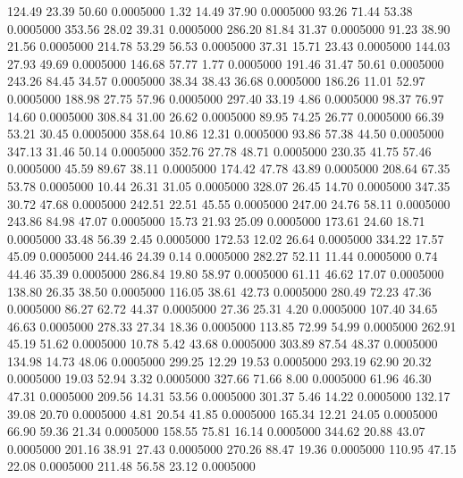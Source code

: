  124.49   23.39   50.60   0.0005000
   1.32   14.49   37.90   0.0005000
  93.26   71.44   53.38   0.0005000
 353.56   28.02   39.31   0.0005000
 286.20   81.84   31.37   0.0005000
  91.23   38.90   21.56   0.0005000
 214.78   53.29   56.53   0.0005000
  37.31   15.71   23.43   0.0005000
 144.03   27.93   49.69   0.0005000
 146.68   57.77    1.77   0.0005000
 191.46   31.47   50.61   0.0005000
 243.26   84.45   34.57   0.0005000
  38.34   38.43   36.68   0.0005000
 186.26   11.01   52.97   0.0005000
 188.98   27.75   57.96   0.0005000
 297.40   33.19    4.86   0.0005000
  98.37   76.97   14.60   0.0005000
 308.84   31.00   26.62   0.0005000
  89.95   74.25   26.77   0.0005000
  66.39   53.21   30.45   0.0005000
 358.64   10.86   12.31   0.0005000
  93.86   57.38   44.50   0.0005000
 347.13   31.46   50.14   0.0005000
 352.76   27.78   48.71   0.0005000
 230.35   41.75   57.46   0.0005000
  45.59   89.67   38.11   0.0005000
 174.42   47.78   43.89   0.0005000
 208.64   67.35   53.78   0.0005000
  10.44   26.31   31.05   0.0005000
 328.07   26.45   14.70   0.0005000
 347.35   30.72   47.68   0.0005000
 242.51   22.51   45.55   0.0005000
 247.00   24.76   58.11   0.0005000
 243.86   84.98   47.07   0.0005000
  15.73   21.93   25.09   0.0005000
 173.61   24.60   18.71   0.0005000
  33.48   56.39    2.45   0.0005000
 172.53   12.02   26.64   0.0005000
 334.22   17.57   45.09   0.0005000
 244.46   24.39    0.14   0.0005000
 282.27   52.11   11.44   0.0005000
   0.74   44.46   35.39   0.0005000
 286.84   19.80   58.97   0.0005000
  61.11   46.62   17.07   0.0005000
 138.80   26.35   38.50   0.0005000
 116.05   38.61   42.73   0.0005000
 280.49   72.23   47.36   0.0005000
  86.27   62.72   44.37   0.0005000
  27.36   25.31    4.20   0.0005000
 107.40   34.65   46.63   0.0005000
 278.33   27.34   18.36   0.0005000
 113.85   72.99   54.99   0.0005000
 262.91   45.19   51.62   0.0005000
  10.78    5.42   43.68   0.0005000
 303.89   87.54   48.37   0.0005000
 134.98   14.73   48.06   0.0005000
 299.25   12.29   19.53   0.0005000
 293.19   62.90   20.32   0.0005000
  19.03   52.94    3.32   0.0005000
 327.66   71.66    8.00   0.0005000
  61.96   46.30   47.31   0.0005000
 209.56   14.31   53.56   0.0005000
 301.37    5.46   14.22   0.0005000
 132.17   39.08   20.70   0.0005000
   4.81   20.54   41.85   0.0005000
 165.34   12.21   24.05   0.0005000
  66.90   59.36   21.34   0.0005000
 158.55   75.81   16.14   0.0005000
 344.62   20.88   43.07   0.0005000
 201.16   38.91   27.43   0.0005000
 270.26   88.47   19.36   0.0005000
 110.95   47.15   22.08   0.0005000
 211.48   56.58   23.12   0.0005000
